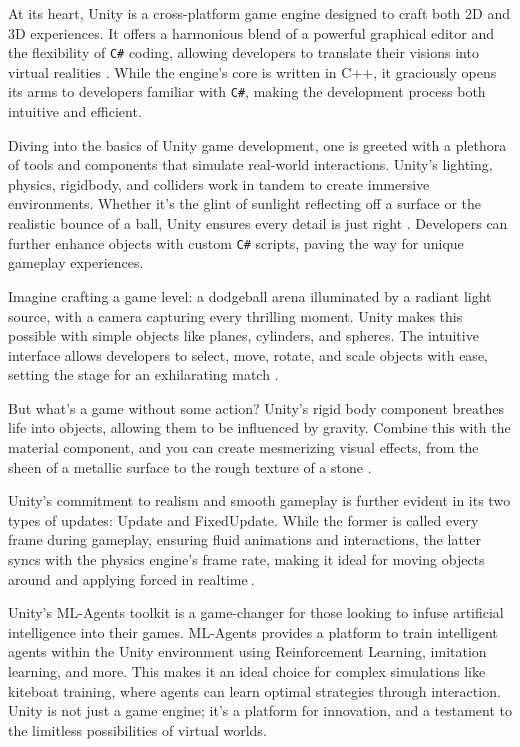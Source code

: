 At its heart, Unity is a cross-platform game engine designed to craft both 2D and 3D experiences. It offers a harmonious blend of a powerful graphical editor and the flexibility of \texttt{C\#} coding, allowing developers to translate their visions into virtual realities \cite{unitymanual2021}. While the engine's core is written in C++, it graciously opens its arms to developers familiar with \texttt{C\#}, making the development process both intuitive and efficient.

Diving into the basics of Unity game development, one is greeted with a plethora of tools and components that simulate real-world interactions. Unity's lighting, physics, rigidbody, and colliders work in tandem to create immersive environments. Whether it's the glint of sunlight reflecting off a surface or the realistic bounce of a ball, Unity ensures every detail is just right \cite{goldstone2010}. Developers can further enhance objects with custom \texttt{C\#} scripts, paving the way for unique gameplay experiences.

Imagine crafting a game level: a dodgeball arena illuminated by a radiant light source, with a camera capturing every thrilling moment. Unity makes this possible with simple objects like planes, cylinders, and spheres. The intuitive interface allows developers to select, move, rotate, and scale objects with ease, setting the stage for an exhilarating match \cite{harrison2013}.

But what's a game without some action? Unity's rigid body component breathes life into objects, allowing them to be influenced by gravity. Combine this with the material component, and you can create mesmerizing visual effects, from the sheen of a metallic surface to the rough texture of a stone \cite{blackman2012}.

Unity's commitment to realism and smooth gameplay is further evident in its two types of updates: Update and FixedUpdate. While the former is called every frame during gameplay, ensuring fluid animations and interactions, the latter syncs with the physics engine's frame rate, making it ideal for moving objects around and applying forced in realtime$~$\cite{unityupdatefixedupdate}.

Unity's ML-Agents toolkit is a game-changer for those looking to infuse artificial intelligence into their games. ML-Agents provides a platform to train intelligent agents within the Unity environment using Reinforcement Learning, imitation learning, and more. This makes it an ideal choice for complex simulations like kiteboat training, where agents can learn optimal strategies through interaction. Unity is not just a game engine; it's a platform for innovation, and a testament to the limitless possibilities of virtual worlds.

